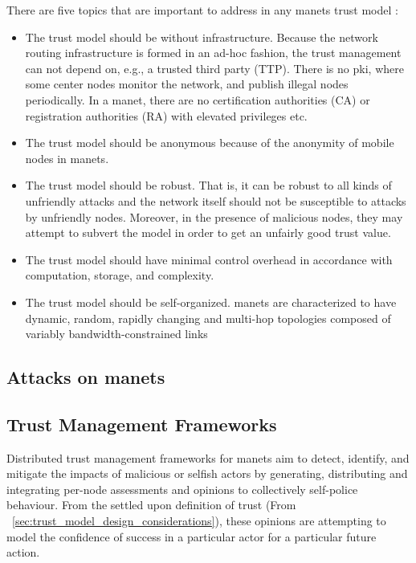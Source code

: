 There are five topics that are important to address in any \glspl{manet} trust model \cite{Kamvar2003}:
%
\begin{itemize}
  \item The trust model should be without infrastructure.
    Because the network routing infrastructure is formed in an ad-hoc fashion, the trust management can not depend on, e.g., a trusted third party (TTP).
    There is no \gls{pki}, where some center nodes monitor the network, and publish illegal nodes periodically.
    In a \gls{manet}, there are no certification authorities (CA) or registration authorities (RA) with elevated privileges etc.
  \item The trust model should be anonymous because of the anonymity of mobile nodes in \glspl{manet}.
  \item The trust model should be robust.
    That is, it can be robust to all kinds of unfriendly attacks and the network itself should not be susceptible to attacks by unfriendly nodes.
    Moreover, in the presence of malicious nodes, they may attempt to subvert the model in order to get an unfairly good trust value.
  \item The trust model should have minimal control overhead in accordance with computation, storage, and complexity.
  \item The trust model should be self-organized.
    \glspl{manet} are characterized to have dynamic, random, rapidly changing and multi-hop topologies composed of variably bandwidth-constrained links
\end{itemize}
%

\subsection{Attacks on \glspl{manet}}




\subsection{Trust Management Frameworks}\label{sec:c2_tmfs}

Distributed trust management frameworks for \glspl{manet} aim to detect, identify, and mitigate the impacts of malicious or selfish actors by generating, distributing and integrating per-node assessments and opinions to collectively self-police behaviour.
From the settled upon definition of trust (From ~\autoref{sec:trust_model_design_considerations}), these opinions are attempting to model the confidence of success in a particular actor for a particular future action.

